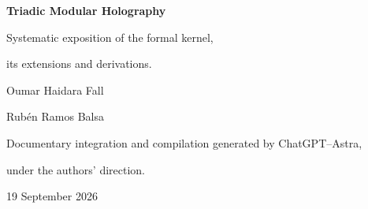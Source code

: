 \hypersetup{pageanchor=false}
\begin{titlepage}
\thispagestyle{empty}
\centering
\vspace*{2.9cm}
{\fontsize{27}{34}\selectfont\bfseries Triadic Modular Holography\par}
\vspace{1.1cm}
{\fontsize{16}{22}\selectfont Systematic exposition of the formal kernel,\par
its extensions and derivations.\par}
\vspace{2cm}
{\large Oumar Haidara Fall\par}
\vspace{.35cm}
{\large Rubén Ramos Balsa\par}
\vfill
{\small Documentary integration and compilation generated by ChatGPT--Astra,\par
under the authors' direction.\par}
\vspace{1.1cm}
{\small 19 September 2026\par}
\end{titlepage}
\hypersetup{pageanchor=true}
